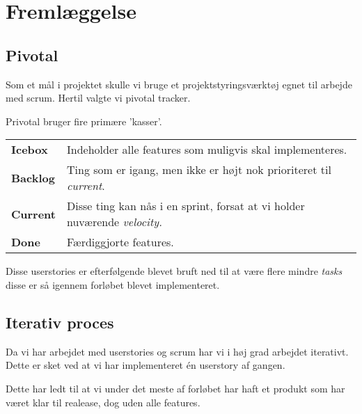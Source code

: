 \section{Fremlæggelse}

\subsection{Pivotal}

Som et mål i projektet skulle vi bruge et projektstyringsværktøj egnet til arbejde med scrum. Hertil valgte vi pivotal tracker.

Privotal bruger fire primære 'kasser'.

\begin{table}[H]
	\begin{tabular}{ll}
		\textbf{Icebox}	& Indeholder alle features som muligvis skal implementeres.\\
		\textbf{Backlog}& Ting som er igang, men  ikke er højt nok prioriteret til \textit{current}.\\
		\textbf{Current}& Disse ting kan nås i en sprint, forsat at vi holder nuværende \textit{velocity.}\\
		\textbf{Done}	& Færdiggjorte features.\\
	\end{tabular}
\end{table}

Disse userstories er efterfølgende blevet bruft ned til at være flere mindre \textit{tasks} disse er så igennem forløbet blevet implementeret.

\subsection{Iterativ proces}

Da vi har arbejdet med userstories og scrum har vi i høj grad arbejdet iterativt. Dette er sket ved at vi har implementeret én userstory af gangen. 

Dette har ledt til at vi under det meste af forløbet har haft et produkt som har været klar til realease, dog uden alle features.